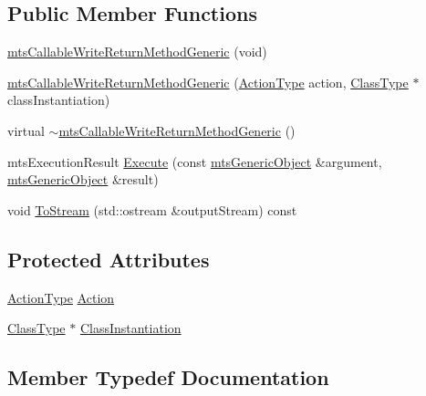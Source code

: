 \subsection*{Public Member Functions}
\begin{DoxyCompactItemize}
\item 
\hyperlink{classmts_callable_write_return_method_generic_aaa279fb8ac7b2f9d4a4ca32f926d91ec}{mts\+Callable\+Write\+Return\+Method\+Generic} (void)
\item 
\hyperlink{classmts_callable_write_return_method_generic_a10bac79c8416929f528f05846cab9e88}{mts\+Callable\+Write\+Return\+Method\+Generic} (\hyperlink{classmts_callable_write_return_method_generic_ad1c87482f62321654e496a4e1929d93c}{Action\+Type} action, \hyperlink{classmts_callable_write_return_method_generic_a32ecf59575aa52541be0693586a2319d}{Class\+Type} $\ast$class\+Instantiation)
\item 
virtual \hyperlink{classmts_callable_write_return_method_generic_a5e0e72a8c660f323a3d9f7d0749f3400}{$\sim$mts\+Callable\+Write\+Return\+Method\+Generic} ()
\item 
mts\+Execution\+Result \hyperlink{classmts_callable_write_return_method_generic_a9ef7437ea9fe1622d42a9b5f49c428f9}{Execute} (const \hyperlink{classmts_generic_object}{mts\+Generic\+Object} \&argument, \hyperlink{classmts_generic_object}{mts\+Generic\+Object} \&result)
\item 
void \hyperlink{classmts_callable_write_return_method_generic_ae99bbbfb944bf164dfa90df630a31263}{To\+Stream} (std\+::ostream \&output\+Stream) const 
\end{DoxyCompactItemize}
\subsection*{Protected Attributes}
\begin{DoxyCompactItemize}
\item 
\hyperlink{classmts_callable_write_return_method_generic_ad1c87482f62321654e496a4e1929d93c}{Action\+Type} \hyperlink{classmts_callable_write_return_method_generic_a26ed7c8f096968628c889c74c330ef56}{Action}
\item 
\hyperlink{classmts_callable_write_return_method_generic_a32ecf59575aa52541be0693586a2319d}{Class\+Type} $\ast$ \hyperlink{classmts_callable_write_return_method_generic_a8439ed2ecdee526070cb9f7d34cd100b}{Class\+Instantiation}
\end{DoxyCompactItemize}


\subsection{Member Typedef Documentation}
\hypertarget{classmts_callable_write_return_method_generic_ad1c87482f62321654e496a4e1929d93c}{}
